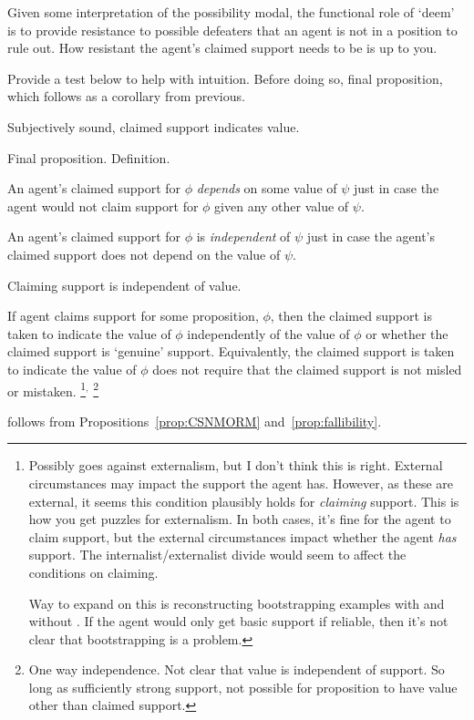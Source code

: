 \begin{note}
  Given some interpretation of the possibility modal, the functional role of `deem' is to provide resistance to possible defeaters that an agent is not in a position to rule out.
  How resistant the agent's claimed support needs to be is up to you.

  Provide a test below to help with intuition.
  Before doing so, final proposition, which follows as a corollary from previous.
\end{note}

\begin{note}[\eiS{}]
  Subjectively sound, claimed support indicates value.

  Final proposition.
  Definition.

  \begin{definition}
    An agent's claimed support for \(\phi\) \emph{depends} on some value of \(\psi\) just in case the agent would not claim support for \(\phi\) given any other value of \(\psi\).

    An agent's claimed support for \(\phi\) is \emph{independent} of \(\psi\) just in case the agent's claimed support does not depend on the value of \(\psi\).
  \end{definition}

  Claiming support is independent of value.

  \begin{proposition}[\eiS{-} --- \eiS{}]\label{prop:supp:independence}
    If agent claims support for some proposition, \(\phi\), then the claimed support is taken to indicate the value of \(\phi\) independently of the value of \(\phi\) or whether the claimed support is `genuine' support.
    Equivalently, the claimed support is taken to indicate the value of \(\phi\) does not require that the claimed support is not misled or mistaken.\nolinebreak
    \footnote{
      Possibly goes against externalism, but I don't think this is right.
      External circumstances may impact the support the agent has.
      However, as these are external, it seems this condition plausibly holds for \emph{claiming} support.
      This is how you get puzzles for externalism.
      In both cases, it's fine for the agent to claim support, but the external circumstances impact whether the agent \emph{has} support.
      The internalist/externalist divide would seem to affect the conditions on claiming.

      Way to expand on this is reconstructing bootstrapping examples with and without \eiS{}.
      If the agent would only get basic support if reliable, then it's not clear that bootstrapping is a problem.
    }\(^{,}\)\nolinebreak
    \footnote{
      One way independence.
      Not clear that value is independent of support.
      So long as sufficiently strong support, not possible for proposition to have value other than claimed support.
    }
  \end{proposition}
  \eiS{} follows from Propositions~\ref{prop:CSNMORM} and~\ref{prop:fallibility}.


\end{note}

